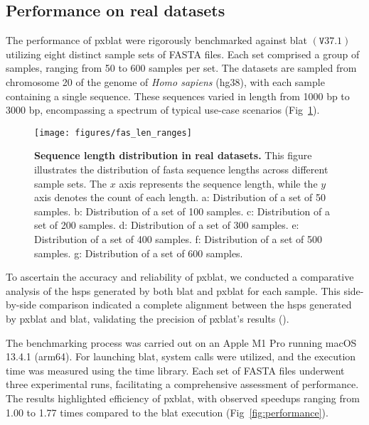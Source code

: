 \documentclass[10pt,letterpaper]{article}
\begin{document}
\subsection*{Performance on real datasets}

The performance of \gls{pxblat} were rigorously benchmarked against \gls{blat} \(\left(\mathtt{V}37.1\right)\) utilizing eight distinct sample sets of FASTA files.
Each set comprised a group of samples, ranging from 50 to 600 samples per set.
The datasets are sampled from chromosome 20 of the genome of \emph{Homo sapiens} (hg38), with each sample containing a single sequence.
These sequences varied in length from \num{1000} bp to \num{3000} bp, encompassing a spectrum of typical use-case scenarios (Fig~\ref{fig:fas_len}).

\begin{figure}[!h]
	\texttt{[image: figures/fas\_len\_ranges]}
	\caption{{\bf Sequence length distribution in real datasets.} This figure illustrates the distribution of fasta sequence lengths across different sample sets. The \(x\) axis represents the sequence length, while the \(y\) axis denotes the count of each length.
		a: Distribution of a set of \num{50} samples.
		b: Distribution of a set of \num{100} samples.
		c: Distribution of a set of \num{200} samples.
		d: Distribution of a set of \num{300} samples.
		e: Distribution of a set of \num{400} samples.
		f: Distribution of a set of \num{500} samples.
		g: Distribution of a set of \num{600} samples.
	}
	\label{fig:fas_len}
\end{figure}

To ascertain the accuracy and reliability of \gls{pxblat}, we conducted a comparative analysis of the \glspl{hsp} generated by both \gls{blat} and \gls{pxblat} for each sample.
This side-by-side comparison indicated a complete alignment between the \glspl{hsp} generated by \gls{pxblat} and \gls{blat}, validating the precision of \gls{pxblat}'s results ().

The benchmarking process was carried out on an Apple M1 Pro running macOS 13.4.1 (arm64).
For launching \gls{blat}, system calls were utilized, and the execution time was measured using the time library.
Each set of FASTA files underwent three experimental runs, facilitating a comprehensive assessment of performance.
The results highlighted efficiency of \gls{pxblat}, with observed speedups ranging from 1.00 to 1.77 times compared to the \gls{blat} execution (Fig~\ref{fig:performance}).
\end{document}
